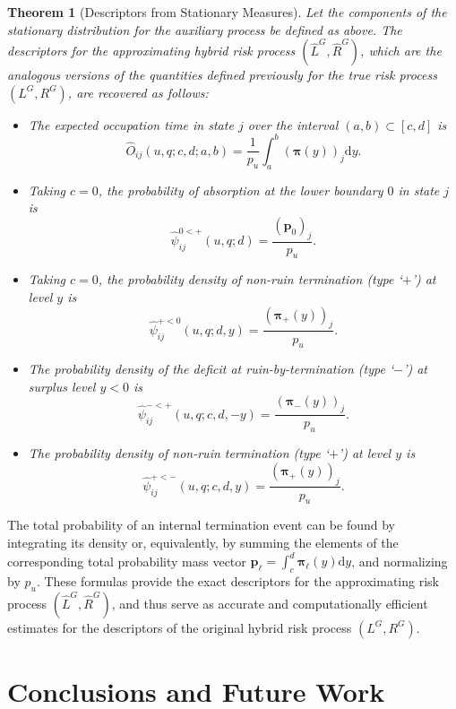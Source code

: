 \documentclass[11pt]{article}
\numberwithin{table}{section}
\numberwithin{figure}{section}
\numberwithin{equation}{section}
\newcommand{\dd}{\mathrm{d}}
\newcommand{\1}{{\mathbf 1}}
\newcommand{\0}{\mat{0}}
\newtheorem{theorem}[lemma]{Theorem}
\begin{document}
\begin{theorem}[Descriptors from Stationary Measures]
Let the components of the stationary distribution for the auxiliary process be defined as above. The descriptors for the approximating hybrid risk process $(\hat{L}^G, \hat{R}^G)$, which are the analogous versions of the quantities defined previously for the true risk process $(L^G, R^G)$, are recovered as follows:
\begin{itemize}
    \item The expected occupation time in state $j$ over the interval $(a,b) \subset [c,d]$ is
    \[
    \hat{O}_{ij}(u,q;c,d;a,b) = \frac{1}{p_u}\int_a^b (\boldsymbol{\pi}(y))_j \dd y.
    \]
    \item Taking $c=0$, the probability of absorption at the lower boundary $0$ in state $j$ is
    \[
    \hat{\psi}_{ij}^{0 < +}(u, q; d) = \frac{(\mathbf{p}_{0})_j}{p_u}.
    \]
    \item Taking $c=0$, the probability density of non-ruin termination (type `$+$') at level $y$ is
    \[
    \hat{\psi}_{ij}^{+<0}(u, q; d, y) = \frac{(\boldsymbol{\pi}_{+}(y))_j}{p_u}.
    \]
    \item The probability density of the deficit at ruin-by-termination (type `$-$') at surplus level $y<0$ is
    \[
    \hat{\psi}_{ij}^{-<+}(u, q; c,d, -y) = \frac{(\boldsymbol{\pi}_{-}(y))_j}{p_u}.
    \]
    \item The probability density of non-ruin termination (type `$+$') at level $y$ is
    \[
    \hat{\psi}_{ij}^{+<-}(u, q; c,d, y) = \frac{(\boldsymbol{\pi}_{+}(y))_j}{p_u}.
    \]

\end{itemize}
\end{theorem}
The total probability of an internal termination event can be found by integrating its density or, equivalently, by summing the elements of the corresponding total probability mass vector $\mathbf{p}_\ell = \int_c^d \boldsymbol{\pi}_\ell(y) \dd y$, and normalizing by $p_u$. { These formulas provide the exact descriptors for the approximating risk process $(\hat{L}^G, \hat{R}^G)$, and thus serve as} accurate and computationally efficient estimates for the descriptors of the original hybrid risk process $({L}^G, {R}^G)$.

\section{Conclusions and Future Work}\label{sec:conclusion}
\end{document}
